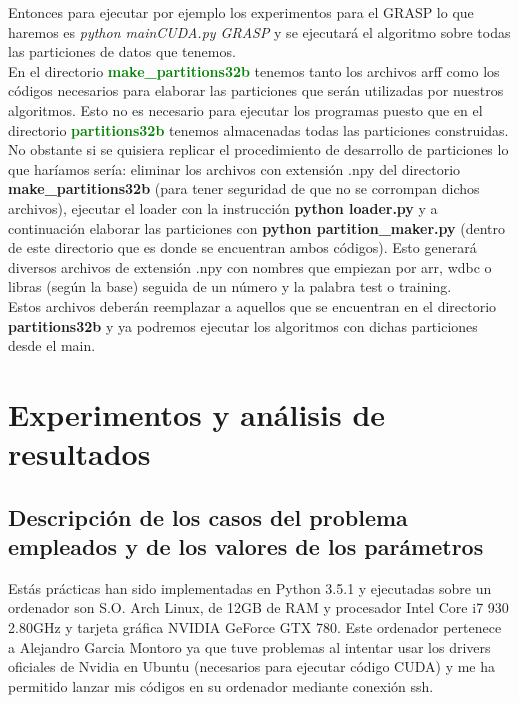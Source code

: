 \documentclass[10pt,a4paper]{article}
\begin{document}
Entonces para ejecutar por ejemplo los experimentos para el GRASP lo que haremos es \textit{python mainCUDA.py GRASP} y se ejecutará el algoritmo sobre todas las particiones de datos que tenemos.\\

En el directorio \textbf{\textcolor{green}{make\_partitions32b}} tenemos tanto los archivos arff como los códigos necesarios para elaborar las particiones que serán utilizadas por nuestros algoritmos. Esto no es necesario para ejecutar los programas puesto que en el directorio \textbf{\textcolor{green}{partitions32b}} tenemos almacenadas todas las particiones construidas. No obstante si se quisiera replicar el procedimiento de desarrollo de particiones lo que haríamos sería: eliminar los archivos con extensión .npy del directorio \textbf{make\_partitions32b} (para tener seguridad de que no se corrompan dichos archivos), ejecutar el loader con la instrucción \textbf{python loader.py} y a continuación elaborar las particiones con \textbf{python partition\_maker.py} (dentro de este directorio que es donde se encuentran ambos códigos). Esto generará diversos archivos de extensión .npy con nombres que empiezan por arr, wdbc o libras (según la base) seguida de un número y la palabra test o training.\\

Estos archivos deberán reemplazar a aquellos que se encuentran en el directorio \textbf{partitions32b} y ya podremos ejecutar los algoritmos con dichas particiones desde el main.\\

\newpage
\section{\color[rgb]{0.0,0.0,0.21}Experimentos y análisis de resultados}

\subsection{\color[rgb]{0.0,0.0,0.51}Descripción de los casos del problema empleados y de los valores de los parámetros}


Estás prácticas han sido implementadas en Python 3.5.1 y ejecutadas sobre un ordenador son S.O. Arch Linux, de 12GB de RAM y procesador Intel Core i7 930 2.80GHz y tarjeta gráfica NVIDIA GeForce GTX 780. Este ordenador pertenece a Alejandro Garcia Montoro ya que tuve problemas al intentar usar los drivers oficiales de Nvidia en Ubuntu (necesarios para ejecutar código CUDA) y me ha permitido lanzar mis códigos en su ordenador mediante conexión ssh.\\
\end{document}
